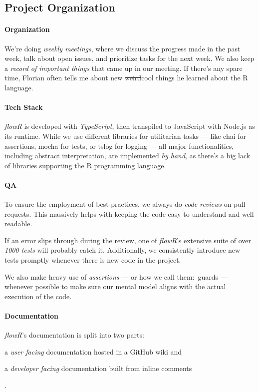 \documentclass[color,coloraccent=red!60!black,listings]{poster}
\def\flowr{\textit{flowR}}
\begin{document}
\begin{multicols}{3}
	\section*{Project Organization}
	\paragraph{Organization} We're doing \emph{weekly meetings}, where we discuss the
	progress made in the past week, talk about open issues, and prioritize tasks for the
	next week. We also keep a \emph{record of important things} that came up in our
	meeting. If there's any spare time, Florian often tells me about new
	\sout{weird}cool things he learned about the R language.
	\paragraph{Tech Stack} \flowr{} is developed with \emph{TypeScript}, then transpiled
	to JavaScript with Node.js as its runtime. While we use different libraries for
	utilitarian tasks --- like chai for assertions, mocha for tests, or tslog for
	logging --- all major functionalities, including abstract interpretation, are
	implemented \emph{by hand}, as there's a big lack of libraries supporting the R
	programming language.
	\paragraph{QA} To ensure the employment of best practices, we always do \emph{code
	reviews} on pull requests. This massively helps with keeping the code easy to
	understand and well readable.\par
	If an error slips through during the review, one of \flowr's extensive suite of over
	\emph{1000 tests} will probably catch it. Additionally, we consistently introduce
	new tests promptly whenever there is new code in the project.\par
	We also make heavy use of \emph{assertions} --- or how we call them:~guards ---
	whenever possible to make sure our mental model aligns with the actual execution of
	the code.
	\paragraph{Documentation} \flowr's documentation is split into two parts:
	\begin{enumerate*}
		\item a \emph{user facing} documentation hosted in a GitHub wiki and
		\item a \emph{developer facing} documentation built from inline comments
	\end{enumerate*}. %

\end{multicols}
\end{document}
